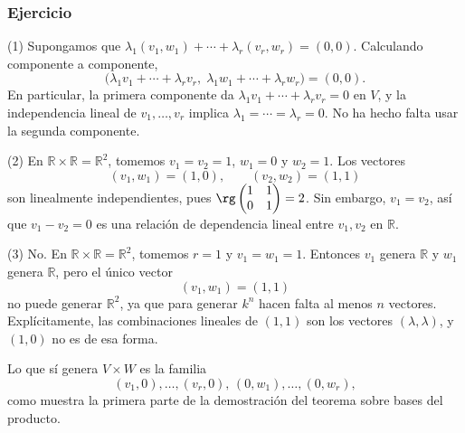 \begin{frame}[allowframebreaks]
    \frametitle{Ejercicio}

    \begin{solution}
        \alert{(1)} Supongamos que
        $\lambda_1(v_1,w_1)+\cdots+\lambda_r(v_r,w_r)=(0,0)$.
        Calculando componente a componente,
        \[
            \bigl(\lambda_1v_1+\cdots+\lambda_rv_r,\;
                  \lambda_1w_1+\cdots+\lambda_rw_r\bigr)=(0,0).
        \]
        En particular, la primera componente da
        $\lambda_1v_1+\cdots+\lambda_rv_r=0$ en $V$, y la independencia
        lineal de $v_1,\ldots,v_r$ implica $\lambda_1=\cdots=\lambda_r=0$.
        No ha hecho falta usar la segunda componente.

        \alert{(2)} En $\mathbb{R}\times\mathbb{R}=\mathbb{R}^2$,
        tomemos $v_1=v_2=1$, $w_1=0$ y $w_2=1$. Los vectores
        \[
            (v_1,w_1)=(1,0),
            \qquad
            (v_2,w_2)=(1,1)
        \]
        son linealmente independientes, pues
        $\rg\begin{pmatrix}1&1\\0&1\end{pmatrix}=2$.
        Sin embargo, $v_1=v_2$, así que $v_1-v_2=0$ es una relación
        de dependencia lineal entre $v_1,v_2$ en $\mathbb{R}$.

        \framebreak

        \alert{(3)} No. En $\mathbb{R}\times\mathbb{R}=\mathbb{R}^2$,
        tomemos $r=1$ y $v_1=w_1=1$. Entonces $v_1$ genera $\mathbb{R}$
        y $w_1$ genera $\mathbb{R}$, pero el único vector
        \[
            (v_1,w_1)=(1,1)
        \]
        no puede generar $\mathbb{R}^2$, ya que para generar $k^n$
        hacen falta al menos $n$ vectores. Explícitamente, las
        combinaciones lineales de $(1,1)$ son los vectores $(\lambda,\lambda)$,
        y $(1,0)$ no es de esa forma.

        \medskip

        Lo que sí genera $V\times W$ es la familia
        \[
            (v_1,0),\ldots,(v_r,0),\,(0,w_1),\ldots,(0,w_r),
        \]
        como muestra la primera parte de la demostración del teorema
        sobre bases del producto.
    \end{solution}
\end{frame}
